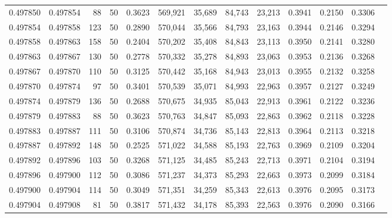 \begin{tabular}{rrrrrrrrrrrrr}
0.497850 & 0.497854 &    88 &  50 &                                     0.3623 & 569,921 &  35,689 &  84,743 &  23,213 & 0.3941 & 0.2150 & 0.3306 \\
0.497854 & 0.497858 &   123 &  50 &                                     0.2890 & 570,044 &  35,566 &  84,793 &  23,163 & 0.3944 & 0.2146 & 0.3294 \\
0.497858 & 0.497863 &   158 &  50 &                                     0.2404 & 570,202 &  35,408 &  84,843 &  23,113 & 0.3950 & 0.2141 & 0.3280 \\
0.497863 & 0.497867 &   130 &  50 &                                     0.2778 & 570,332 &  35,278 &  84,893 &  23,063 & 0.3953 & 0.2136 & 0.3268 \\
0.497867 & 0.497870 &   110 &  50 &                                     0.3125 & 570,442 &  35,168 &  84,943 &  23,013 & 0.3955 & 0.2132 & 0.3258 \\
0.497870 & 0.497874 &    97 &  50 &                                     0.3401 & 570,539 &  35,071 &  84,993 &  22,963 & 0.3957 & 0.2127 & 0.3249 \\
0.497874 & 0.497879 &   136 &  50 &                                     0.2688 & 570,675 &  34,935 &  85,043 &  22,913 & 0.3961 & 0.2122 & 0.3236 \\
0.497879 & 0.497883 &    88 &  50 &                                     0.3623 & 570,763 &  34,847 &  85,093 &  22,863 & 0.3962 & 0.2118 & 0.3228 \\
0.497883 & 0.497887 &   111 &  50 &                                     0.3106 & 570,874 &  34,736 &  85,143 &  22,813 & 0.3964 & 0.2113 & 0.3218 \\
0.497887 & 0.497892 &   148 &  50 &                                     0.2525 & 571,022 &  34,588 &  85,193 &  22,763 & 0.3969 & 0.2109 & 0.3204 \\
0.497892 & 0.497896 &   103 &  50 &                                     0.3268 & 571,125 &  34,485 &  85,243 &  22,713 & 0.3971 & 0.2104 & 0.3194 \\
0.497896 & 0.497900 &   112 &  50 &                                     0.3086 & 571,237 &  34,373 &  85,293 &  22,663 & 0.3973 & 0.2099 & 0.3184 \\
0.497900 & 0.497904 &   114 &  50 &                                     0.3049 & 571,351 &  34,259 &  85,343 &  22,613 & 0.3976 & 0.2095 & 0.3173 \\
0.497904 & 0.497908 &    81 &  50 &                                     0.3817 & 571,432 &  34,178 &  85,393 &  22,563 & 0.3976 & 0.2090 & 0.3166 \\

\end{tabular}
